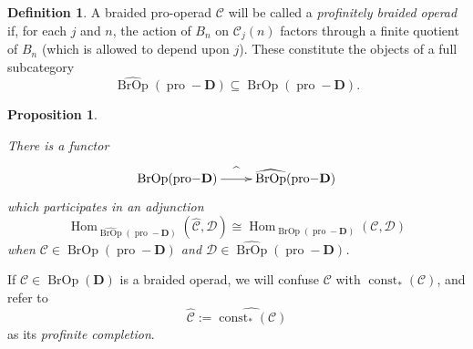 \documentclass[12pt]{article}
\DeclareMathOperator{\Hom}{Hom}
\DeclareMathOperator{\const}{const}
\DeclareMathOperator{\pro}{pro}
\DeclareMathOperator{\BrOp}{BrOp}
\newcommand{\BrOphat}{\widehat{\BrOp}}
\newcommand{\CC} {\mathcal{C}}
\newcommand{\DD} {\mathcal{D}}
\newcommand{\bD} {\mathbf{D}}
\newcommand{\proD}{\pro\!-\bD}
\theoremstyle{plain}
\newtheorem{prop}[thm]{Proposition}
\theoremstyle{definition}
\newtheorem{defn}[thm]{Definition}
\theoremstyle{remark}
\begin{document}
\begin{defn} 

A braided pro-operad $\CC$ will be called a \emph{profinitely braided operad} if, for each $j$ and $n$, the action of $B_n$ on $\CC_j(n)$ factors through a finite quotient of $B_n$ (which is allowed to depend upon $j$).  These constitute the objects of a full subcategory 
%
$$\BrOphat(\proD) \subseteq \BrOp(\proD).$$

\end{defn}

\begin{prop} \label{adjunction_prop}

There is a functor 
%
$$\xymatrix{\BrOp(\proD) \ar[r]^-{\widehat{}} &  \BrOphat(\proD)}$$
%
which participates in an adjunction 
%
$$\Hom_{\BrOphat(\proD)}(\widehat{\CC}, \DD) \cong \Hom_{\BrOp(\proD)}(\CC, \DD)$$
%
when $\CC \in \BrOp(\proD)$ and $\DD \in \BrOphat(\proD)$.

\end{prop}

If $\CC \in \BrOp(\bD)$ is a braided operad, we will confuse $\CC$ with $\const_*(\CC)$, and refer to 
%
$$\widehat{\CC}:= \widehat{\const_*(\CC)}$$
%
as its \emph{profinite completion}.  
\end{document}
